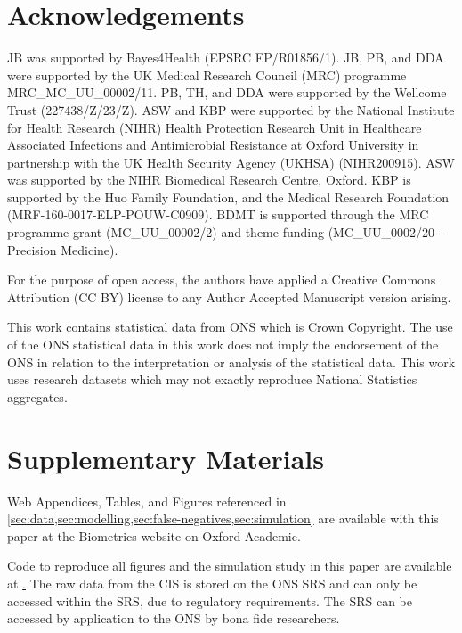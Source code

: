 \documentclass[referee,useAMS,usenatbib]{biom}
\begin{document}
\section*{Acknowledgements}
JB was supported by Bayes4Health (EPSRC  EP/R01856/1).
JB, PB, and DDA were supported by the UK Medical Research Council (MRC) programme MRC\_MC\_UU\_00002/11. 
PB, TH, and DDA were supported by the Wellcome Trust (227438/Z/23/Z).
ASW and KBP were supported by the National Institute for Health Research (NIHR) Health Protection Research Unit in Healthcare Associated Infections and Antimicrobial Resistance at Oxford University in partnership with the UK Health Security Agency (UKHSA) (NIHR200915).
ASW was supported by the NIHR Biomedical Research Centre, Oxford.
KBP is supported by the Huo Family Foundation, and the Medical Research Foundation (MRF-160-0017-ELP-POUW-C0909).
BDMT is supported through the MRC programme grant (MC\_UU\_00002/2) and theme funding (MC\_UU\_0002/20 - Precision Medicine).

For the purpose of open access, the authors have applied a Creative Commons Attribution (CC BY) license to any Author Accepted Manuscript version arising.

This work contains statistical data from ONS which is Crown Copyright. The use of the ONS statistical data in this work does not imply the endorsement of the ONS in relation to the interpretation or analysis of the statistical data. This work uses research datasets which may not exactly reproduce National Statistics aggregates.

 

\section*{Supplementary Materials}

Web Appendices, Tables, and Figures referenced in \cref{sec:data,sec:modelling,sec:false-negatives,sec:simulation} are available with this paper at the Biometrics website on Oxford Academic.

Code to reproduce all figures and the simulation study in this paper are available at \href{https://github.com/joshuablake/COVID-duration-paper}.
The raw data from the CIS is stored on the ONS SRS and can only be accessed within the SRS, due to regulatory requirements.
The SRS can be accessed by application to the ONS by bona fide researchers.

\label{lastpage}
\end{document}
